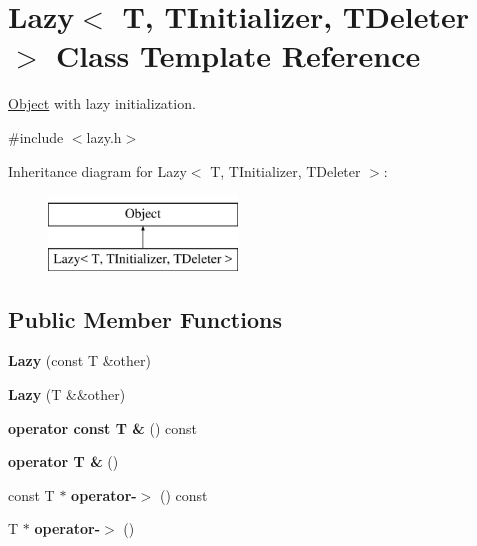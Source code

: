 \hypertarget{classLazy}{}\section{Lazy$<$ T, T\+Initializer, T\+Deleter $>$ Class Template Reference}
\label{classLazy}


\hyperlink{classObject}{Object} with lazy initialization.  




{\ttfamily \#include $<$lazy.\+h$>$}

Inheritance diagram for Lazy$<$ T, T\+Initializer, T\+Deleter $>$\+:\begin{figure}[H]
\begin{center}
\leavevmode
\includegraphics[height=2.000000cm]{classLazy}
\end{center}
\end{figure}
\subsection*{Public Member Functions}
\begin{DoxyCompactItemize}
\item 
\hypertarget{classLazy_a2d248bad1372f13122c26d5d794e21e2}{}\label{classLazy_a2d248bad1372f13122c26d5d794e21e2} 
{\bfseries Lazy} (const T \&other)
\item 
\hypertarget{classLazy_a592aa6189260b2a28b6f2109cf9ccdb2}{}\label{classLazy_a592aa6189260b2a28b6f2109cf9ccdb2} 
{\bfseries Lazy} (T \&\&other)
\item 
\hypertarget{classLazy_a0a6436d3a4b627495b7c7edccc443e5d}{}\label{classLazy_a0a6436d3a4b627495b7c7edccc443e5d} 
{\bfseries operator const T \&} () const
\item 
\hypertarget{classLazy_a2f33b668789cf295b51ae8ce7130eabc}{}\label{classLazy_a2f33b668789cf295b51ae8ce7130eabc} 
{\bfseries operator T \&} ()
\item 
\hypertarget{classLazy_ac2186a3e99146866ca6865b79f0a595e}{}\label{classLazy_ac2186a3e99146866ca6865b79f0a595e} 
const T $\ast$ {\bfseries operator-\/$>$} () const
\item 
\hypertarget{classLazy_aba63ee8a779edfdc001793399ffb9cd4}{}\label{classLazy_aba63ee8a779edfdc001793399ffb9cd4} 
T $\ast$ {\bfseries operator-\/$>$} ()
\end{DoxyCompactItemize}


